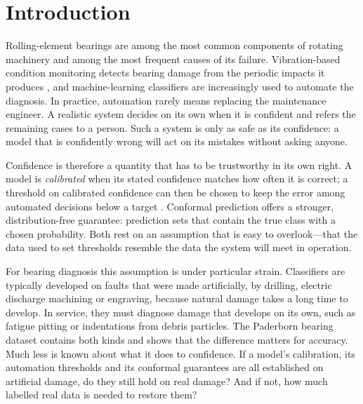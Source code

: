 \section{Introduction}
\label{sec:introduction}

Rolling-element bearings are among the most common components of rotating machinery and among the most frequent
causes of its failure. Vibration-based condition monitoring detects bearing damage from the periodic impacts it produces
\citep{randall2011}, and
machine-learning classifiers are increasingly used to automate the diagnosis. In practice, automation rarely means
replacing the maintenance engineer. A realistic system decides on its own when it is confident and refers the
remaining cases to a person. Such a system is only as safe as its confidence: a model that is confidently wrong will
act on its mistakes without asking anyone.

Confidence is therefore a quantity that has to be trustworthy in its own right. A model is \emph{calibrated}
\citep{guo2017} when its stated confidence matches how often it is correct; a threshold on calibrated confidence can
then be chosen to keep the error among automated decisions below a target \citep{geifman2017}. Conformal prediction
\citep{vovk2005,angelopoulos2023} offers a stronger, distribution-free
guarantee: prediction sets that contain the true class with a chosen probability. Both rest on an assumption that is
easy to overlook---that the data used to set thresholds resemble the data the system will meet in operation.

For bearing diagnosis this assumption is under particular strain. Classifiers are typically developed on faults that
were made artificially, by drilling, electric discharge machining or engraving, because natural damage takes a long
time to develop. In service, they must diagnose damage that develops on its own, such as fatigue pitting or
indentations from debris particles. The Paderborn bearing
dataset \citep{lessmeier2016} contains both kinds and shows that the difference matters for accuracy. Much less is
known about what it does to confidence. If a model's calibration, its automation thresholds and its conformal
guarantees are all established on artificial damage, do they still hold on real damage? And if not, how much labelled
real data is needed to restore them?

